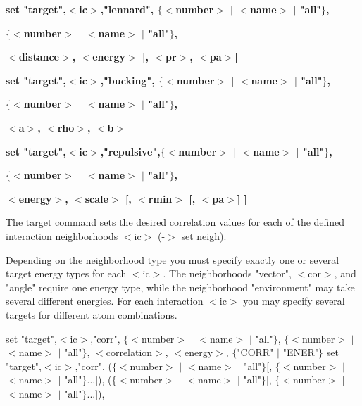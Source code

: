 {\bf set "target",$ <$ic$> $,"lennard",  $ \{$$ <$number$> $ $| $ $ <$name$> $ $| $ "all"$\} $, \par }
{\bf                               $ \{$$ <$number$> $ $| $ $ <$name$> $ $| $ "all"$\} $, \par }
{\bf                               $ <$distance$> $,    $ <$energy$> $ [, $ <$pr$> $, $ <$pa$> $] \par }
{\bf set "target",$ <$ic$> $,"bucking",  $ \{$$ <$number$> $ $| $ $ <$name$> $ $| $ "all"$\} $, \par }
{\bf                               $ \{$$ <$number$> $ $| $ $ <$name$> $ $| $ "all"$\} $, \par }
{\bf                               $ <$a$> $, $ <$rho$> $, $ <$b$> $ \par }
{\bf set "target",$ <$ic$> $,"repulsive",$ \{$$ <$number$> $ $| $ $ <$name$> $ $| $ "all"$\} $, \par }
{\bf                               $ \{$$ <$number$> $ $| $ $ <$name$> $ $| $ "all"$\} $, \par }
{\bf                               $ <$energy$> $,    $ <$scale$> $ [, $ <$rmin$> $ [, $ <$pa$> $] ] \par }
{\bf  \par }
\par
\vspace{3pt}
The target command sets the desired correlation values for each of 
the defined interaction neighborhoods $ <$ic$> $ (-$> $ set neigh). 
\par
Depending on the neighborhood type you must specify exactly one 
or several target energy types for each $ <$ic$> $. The neighborhoods 
"vector", $ <$cor$> $, and "angle" require one energy type, while the 
neighborhood "environment" may take several different energies. 
For each interaction $ <$ic$> $ you may specify several targets for different 
atom combinations. 
\par
set "target",$ <$ic$> $,"corr",     $ \{$$ <$number$> $ $| $ $ <$name$> $ $| $ "all"$\} $, 
                              $ \{$$ <$number$> $ $| $ $ <$name$> $ $| $ "all"$\} $, 
                              $ <$correlation$> $, $ <$energy$> $, $ \{$"CORR" $| $ "ENER"$\} $ 
set "target",$ <$ic$> $,"corr",    ($ \{$$ <$number$> $ $| $ $ <$name$> $ $| $ "all"$\} $[, $ \{$$ <$number$> $ $| $ $ <$name$> $ $| $ "all"$\} $...]), 
                             ($ \{$$ <$number$> $ $| $ $ <$name$> $ $| $ "all"$\} $[, $ \{$$ <$number$> $ $| $ $ <$name$> $ $| $ "all"$\} $...]), 
\par
